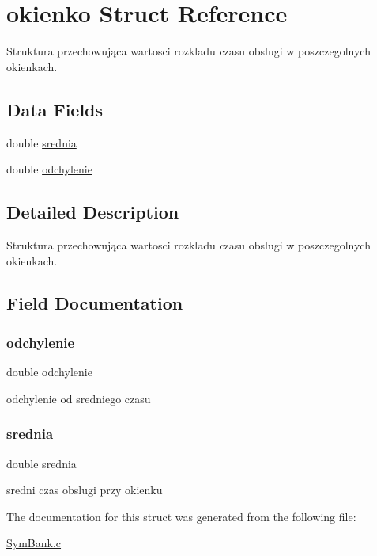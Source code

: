 \hypertarget{structokienko}{}\section{okienko Struct Reference}
\label{structokienko}


Struktura przechowująca wartosci rozkladu czasu obslugi w poszczegolnych okienkach.  


\subsection*{Data Fields}
\begin{DoxyCompactItemize}
\item 
double \hyperlink{structokienko_aa93da47b994a05be9c7116ff657d6ad4}{srednia}
\item 
double \hyperlink{structokienko_aa30144067a7b85b6fad270378f9a12b8}{odchylenie}
\end{DoxyCompactItemize}


\subsection{Detailed Description}
Struktura przechowująca wartosci rozkladu czasu obslugi w poszczegolnych okienkach. 

\subsection{Field Documentation}
\mbox{\label{structokienko_aa30144067a7b85b6fad270378f9a12b8}} 
\subsubsection{\texorpdfstring{odchylenie}{odchylenie}}
{\footnotesize\ttfamily double odchylenie}

odchylenie od sredniego czasu \mbox{\label{structokienko_aa93da47b994a05be9c7116ff657d6ad4}} 
\subsubsection{\texorpdfstring{srednia}{srednia}}
{\footnotesize\ttfamily double srednia}

sredni czas obslugi przy okienku 

The documentation for this struct was generated from the following file\+:\begin{DoxyCompactItemize}
\item 
\hyperlink{_sym_bank_8c}{Sym\+Bank.\+c}\end{DoxyCompactItemize}
